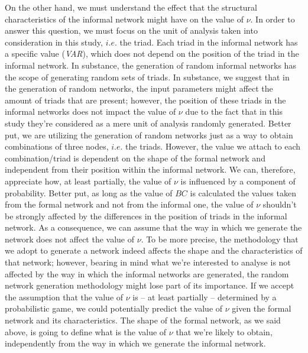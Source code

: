 \documentclass{article}
\begin{document}
On the other hand, we must understand the effect that the structural characteristics of the informal network might have on the value of $\nu$. In order to answer this question, we must focus on the unit of analysis taken into consideration in this study, $i.e.$ the triad. Each triad in the informal network has a specific value (\emph{VAR}), which does not depend on the position of the triad in the informal network. In substance, the generation of random informal networks has the scope of generating random sets of triads. In substance, we suggest that in the generation of random networks, the input parameters might affect the amount of triads that are present; however, the position of these triads in the informal networks does not impact the value of $\nu$ due to the fact that in this study they’re considered as a mere unit of analysis randomly generated. Better put, we are utilizing the generation of random networks just as a way to obtain combinations of three nodes, $i.e.$ the triads. However, the value we attach to each combination/triad is dependent on the shape of the formal network and independent from their position within the informal network. We can, therefore, appreciate how, at least partially, the value of $\nu$ is influenced by a component of probability. Better put, as long as the value of $BC$ is calculated the values taken from the formal network and not from the informal one, the value of $\nu$ shouldn’t be strongly affected by the differences in the position of triads in the informal network. As a consequence, we can assume that the way in which we generate the network  does not affect the value of $\nu$. To be more precise, the methodology that we adopt to generate a network indeed affects the shape and the characteristics of that network; however, bearing in mind what we're interested to analyse is not affected by the way in which the informal networks are generated, the random network generation methodology might lose part of its importance.
If we accept the assumption that the value of $\nu$ is – at least partially – determined by a probabilistic game, we could potentially predict the value of $\nu$ given the formal network and its characteristics. The shape of the formal network, as we said above, is going to define what is the value of $\nu$ that we’re likely to obtain, independently from the way in which we generate the informal network.
\end{document}
